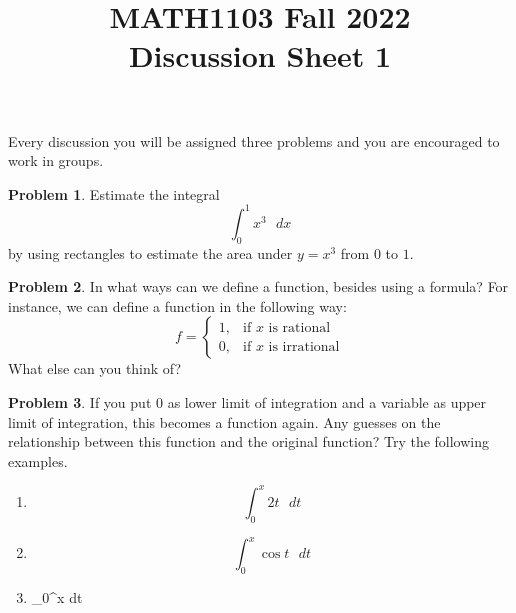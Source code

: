 \documentclass[11pt,oneside]{amsart}
\title{MATH1103 Fall 2022\\
Discussion Sheet 1}
\theoremstyle{definition}
\newtheorem{problem}{Problem}
\begin{document}
    \maketitle
    Every discussion you will be assigned three problems and you are encouraged to work in groups.

    \begin{problem}
        Estimate the integral
        $$
        \int_0^1 x^3 \text{ }dx
        $$
        by using rectangles to estimate the area under $y=x^3$ from $0$ to $1$.
    \end{problem}

    \begin{problem}
       In what ways can we define a function, besides using a formula? For instance, we can define a function in the following way:
       $$
       f=
       \begin{cases}
       1, & \text{if $x$ is rational}\\
       0, & \text{if $x$ is irrational}
       \end{cases}
       $$
       What else can you think of?
    \end{problem}

    \begin{problem}
        If you put 0 as lower limit of integration and a variable as upper limit of integration, this becomes a function again. Any guesses on the relationship between this function and the original function? Try the following examples.
        \begin{enumerate}
            \item $$\int_0^x 2t\text{ }dt$$
            \item $$\int_ 0^x \cos t \text{ }dt$$
            \item $$\int_0^x  \text{ }dt
        \end{enumerate}
        
    \end{problem}
\end{document}
